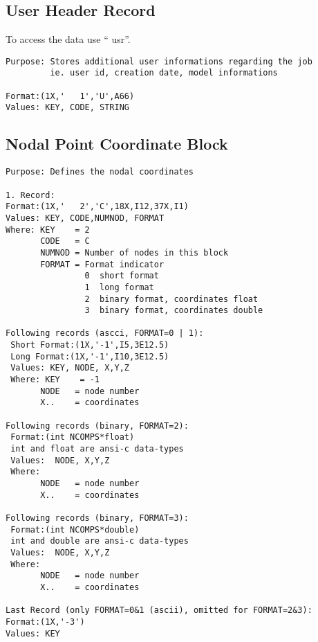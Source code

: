 \documentclass{article}
\begin{document}
\subsection{\label{User Header Record}User Header Record}
To access the data use `` usr''.
\begin{verbatim}
Purpose: Stores additional user informations regarding the job
         ie. user id, creation date, model informations

Format:(1X,'   1','U',A66)  
Values: KEY, CODE, STRING
\end{verbatim}

\subsection{\label{Nodal Point Coordinate Block}Nodal Point Coordinate Block}
\begin{verbatim}
Purpose: Defines the nodal coordinates

1. Record:
Format:(1X,'   2','C',18X,I12,37X,I1)
Values: KEY, CODE,NUMNOD, FORMAT
Where: KEY    = 2
       CODE   = C
       NUMNOD = Number of nodes in this block
       FORMAT = Format indicator
                0  short format
                1  long format 
                2  binary format, coordinates float 
                3  binary format, coordinates double 

Following records (ascci, FORMAT=0 | 1):
 Short Format:(1X,'-1',I5,3E12.5)
 Long Format:(1X,'-1',I10,3E12.5)
 Values: KEY, NODE, X,Y,Z
 Where: KEY    = -1
       NODE   = node number
       X..    = coordinates

Following records (binary, FORMAT=2):
 Format:(int NCOMPS*float)
 int and float are ansi-c data-types
 Values:  NODE, X,Y,Z
 Where: 
       NODE   = node number
       X..    = coordinates

Following records (binary, FORMAT=3):
 Format:(int NCOMPS*double)
 int and double are ansi-c data-types
 Values:  NODE, X,Y,Z
 Where: 
       NODE   = node number
       X..    = coordinates
  
Last Record (only FORMAT=0&1 (ascii), omitted for FORMAT=2&3):
Format:(1X,'-3')
Values: KEY
\end{verbatim}
\end{document}
